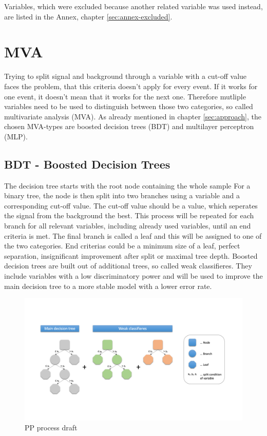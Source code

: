 \documentclass[11pt]{scrartcl}
\begin{document}
Variables, which were excluded because another related variable was used instead, are listed in the Annex, chapter \ref{sec:annex-excluded}. 

\section{MVA}

Trying to split signal and background through a variable with a cut-off value faces the problem, that this criteria doesn't apply for every event. If it works for one event, it doesn't mean that it works for the next one. Therefore mutliple variables need to be used to distinguish between those two categories, so called multivariate analysis (MVA). As already mentioned in chapter \ref{sec:approach}, the chosen MVA-types are boosted decision trees (BDT) and multilayer perceptron (MLP).

	\subsection{BDT - Boosted Decision Trees}
	The decision tree starts with the root node containing the whole sample For a binary tree, the node is then split into two branches using a variable and a corresponding cut-off value. The cut-off value should be a value, which seperates the signal from the background the best. This process will be repeated for each branch for all relevant variables, including already used variables, until an end criteria is met. The final branch is called a leaf and this will be assigned to one of the two categories. End criterias could be a minimum size of a leaf, perfect separation, insignificant improvement after split or maximal tree depth. Boosted decision trees are built out of additional trees, so called weak classifieres. They include variables with a low discriminatory power and will be used to improve the main decision tree to a more stable model with a lower error rate. 

	\begin{figure}[H]
	\centering
	\includegraphics[width=1\textwidth]{figures/BDT.png}
	\caption{PP process draft}
	\end{figure}
	
\end{document}
